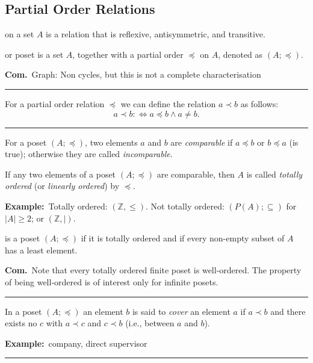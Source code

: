 \documentclass[a4paper]{extarticle}
\newcommand{\Com}{\textbf{Com.}\ }
\newcommand{\Ex}{\textbf{Example:}\ }
\newcommand{\Z}{\mathbb{Z}}
\newcommand{\card}[1]{\lvert #1 \rvert}
\newcommand{\sep}{\vspace{5pt}\noindent\hrule\vspace{5pt}}
\begin{document}
\begin{multicols*}{2}

\subsection{Partial Order Relations}

 on a set $A$ is a relation that is reflexive,
antisymmetric, and transitive.

 or poset is a set $A$, together with a partial order
$\preceq$ on $A$, denoted as $(A;\preceq)$.

\Com Graph: Non cycles, but this is not a complete characterisation

\sep

\Def For a partial order relation $\preceq$ we can define the relation
$a\prec b$ as follows:
\[
a\prec b :\Longleftrightarrow a\preceq b \land a \neq b.
\]

\sep

\Def[Comparability] For a poset $(A;\preceq)$, two elements $a$ and $b$ are
\emph{comparable} if $a\preceq b$ or $b\preceq a$ (is true); otherwise they are
called \emph{incomparable}.

 If any two elements of a poset $(A;\preceq)$ are comparable,
then $A$ is called \emph{totally ordered} (or \emph{linearly ordered}) by $\preceq$. 

\Ex Totally ordered: $(\Z,\leq)$. Not totally ordered: $(P(A);\subseteq)$ for
$\card{A}\geq 2$; or $(\Z,|)$.

 is a poset $(A;\preceq)$ if it is totally ordered
and if every non-empty subset of $A$ has a least element.

\Com Note that every totally ordered finite poset is well-ordered. The property
of being well-ordered is of interest only for infinite posets.

\sep

\Def[Covering] In a poset $(A;\preceq)$ an element $b$ is said to \emph{cover}
an element $a$ if $a\prec b$ and there exists no $c$ with $a\prec c$ and $c \prec
b$ (i.e., between $a$ and $b$).

\Ex company, direct supervisor

\sep


\end{multicols*}
\end{document}
